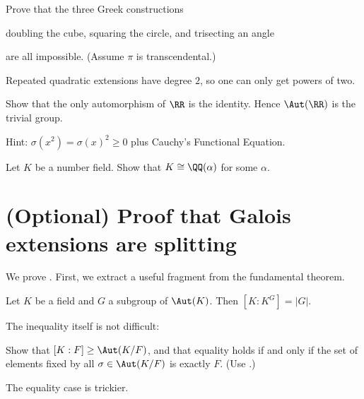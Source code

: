 \begin{problem}
	Prove that the three Greek constructions
	\begin{enumerate}[(a)]
		\ii doubling the cube,
		\ii squaring the circle, and
		\ii trisecting an angle
	\end{enumerate}
	are all impossible.
	(Assume $\pi$ is transcendental.)
	\begin{hint}
		Repeated quadratic extensions have degree $2$, so one can
		only get powers of two.
	\end{hint}
\end{problem}

\begin{problem}
	Show that the only automorphism of $\RR$ is the identity.
	Hence $\Aut(\RR)$ is the trivial group.
	\begin{hint}
		Hint: $\sigma(x^2) = \sigma(x)^2 \ge 0$ plus Cauchy's Functional Equation.
	\end{hint}
\end{problem}

\begin{problem}
	\yod
	Let $K$ be a number field.
	Show that $K \cong \QQ(\alpha)$ for some $\alpha$.
	\label{prob:artin_primitive_elm}
\end{problem}
\pagebreak
\section{(Optional) Proof that Galois extensions are splitting}
We prove .
First, we extract a useful fragment from the fundamental theorem.
\begin{theorem}
	\label{thm:fixed_field_theorem}
	Let $K$ be a field and $G$ a subgroup of $\Aut(K)$.
	Then $[K:K^G] = \left\lvert G \right\rvert$.
\end{theorem}

The inequality itself is not difficult:
\begin{exercise}
	Show that $[K:F] \ge \Aut(K/F)$,
	and that equality holds if and only if
	the set of elements fixed by all $\sigma \in \Aut(K/F)$
	is exactly $F$.
	(Use .)
\end{exercise}
The equality case is trickier.

